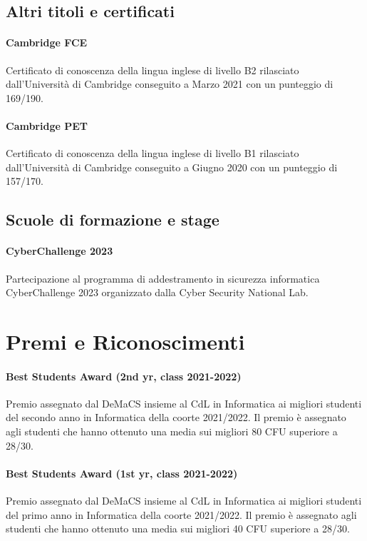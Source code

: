 \documentclass[a4paper, 10pt]{article}
\begin{document}
\subsection{Altri titoli e certificati}

\paragraph{\textbf{Cambridge FCE}}
Certificato di conoscenza della lingua inglese di livello B2 rilasciato dall'Università di Cambridge conseguito a Marzo 2021 con un punteggio di 169/190.

\paragraph{\textbf{Cambridge PET}}
Certificato di conoscenza della lingua inglese di livello B1 rilasciato dall'Università di Cambridge conseguito a Giugno 2020 con un punteggio di 157/170.

\subsection{Scuole di formazione e stage}

\paragraph{\textbf{CyberChallenge 2023}}
Partecipazione al programma di addestramento in sicurezza informatica CyberChallenge 2023 organizzato dalla Cyber Security National Lab.

\section{Premi e Riconoscimenti}

\paragraph{\textbf{Best Students Award (2nd yr, class 2021-2022)}}
Premio assegnato dal DeMaCS insieme al CdL in Informatica ai migliori studenti del secondo anno in Informatica della coorte 2021/2022. Il premio è assegnato agli studenti che hanno ottenuto una media sui migliori 80 CFU superiore a 28/30.

\paragraph{\textbf{Best Students Award (1st yr, class 2021-2022)}}
Premio assegnato dal DeMaCS insieme al CdL in Informatica ai migliori studenti del primo anno in Informatica della coorte 2021/2022. Il premio è assegnato agli studenti che hanno ottenuto una media sui migliori 40 CFU superiore a 28/30.
\end{document}
